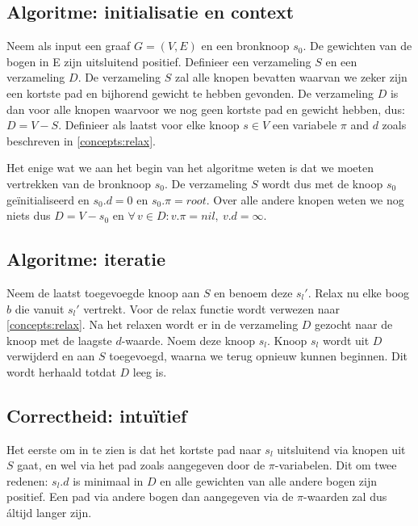 \documentclass[conference]{IEEEtran}
\theoremstyle{definition}
\theoremstyle{remark}
\let \oldforall \forall
\renewcommand{\forall}{\oldforall\,}
\begin{document}
\subsection{Algoritme: initialisatie en context}
Neem als input een graaf $G = (V, E)$ en een bronknoop $s_0$. De gewichten van de bogen in E zijn uitsluitend positief. Definieer een verzameling $S$ en een verzameling $D$. De verzameling $S$ zal alle knopen bevatten waarvan we zeker zijn een kortste pad en bijhorend gewicht te hebben gevonden. De verzameling $D$ is dan voor alle knopen waarvoor we nog geen kortste pad en gewicht hebben, dus: $D = V - S$. Definieer als laatst voor elke knoop $s \in V$ een variabele $\pi$ and $d$ zoals beschreven in \ref{concepts:relax}.

Het enige wat we aan het begin van het algoritme weten is dat we moeten vertrekken van de bronknoop $s_0$. De verzameling $S$ wordt dus met de knoop $s_0$ geïnitialiseerd en $s_{0}.d = 0$ en $s_{0}.\pi = root$. Over alle andere knopen weten we nog niets dus $D = V - {s_0}$ en $\forall v \in D: v.\pi = nil,\ v.d = \infty$.

\subsection{Algoritme: iteratie}
Neem de laatst toegevoegde knoop aan $S$ en benoem deze $s_l'$. Relax nu elke boog $b$ die vanuit $s_l'$ vertrekt. Voor de relax functie wordt verwezen naar \ref{concepts:relax}. Na het relaxen wordt er in de verzameling $D$ gezocht naar de knoop met de laagste $d$-waarde. Noem deze knoop $s_l$. Knoop $s_l$ wordt uit $D$ verwijderd en aan $S$ toegevoegd, waarna we terug opnieuw kunnen beginnen. Dit wordt herhaald totdat $D$ leeg is.

\subsection{Correctheid: intuïtief}
Het eerste om in te zien is dat het kortste pad naar $s_l$ uitsluitend via knopen uit $S$ gaat, en wel via het pad zoals aangegeven door de $\pi$-variabelen. Dit om twee redenen: $s_l.d$ is minimaal in $D$ en alle gewichten van alle andere bogen zijn positief. Een pad via andere bogen dan aangegeven via de $\pi$-waarden zal dus áltijd langer zijn.
\end{document}
